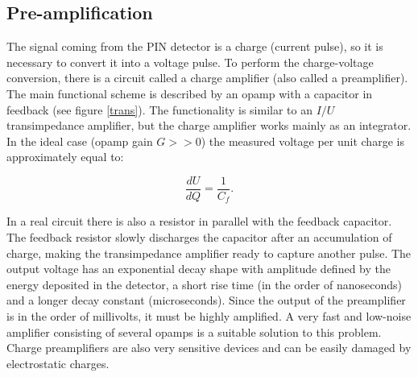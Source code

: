 \subsection{Pre-amplification}
The signal coming from the PIN detector is a charge (current pulse), so it is necessary to convert it into a voltage pulse. To perform the charge-voltage conversion, there is a circuit called a charge amplifier (also called a preamplifier). The main functional scheme is described by an opamp with a capacitor in feedback (see figure \ref{trans}). The functionality is similar to an $I/U$ transimpedance amplifier, but the charge amplifier works mainly as an integrator. In the ideal case (opamp gain $G >> 0$) the measured voltage per unit charge is approximately equal to:

\begin{equation}
\frac{dU}{dQ} = \frac{1}{C_{f}}.
\end{equation}
\par
In a real circuit there is also a resistor in parallel with the feedback capacitor. The feedback resistor slowly discharges the capacitor after an accumulation of charge, making the transimpedance amplifier ready to capture another pulse. The output voltage has an exponential decay shape with amplitude defined by the energy deposited in the detector, a short rise time (in the order of nanoseconds) and a longer decay constant (microseconds). Since the output of the preamplifier is in the order of millivolts, it must be highly amplified. A very fast and low-noise amplifier consisting of several opamps is a suitable solution to this problem. Charge preamplifiers are also very sensitive devices and can be easily damaged by electrostatic charges. 

